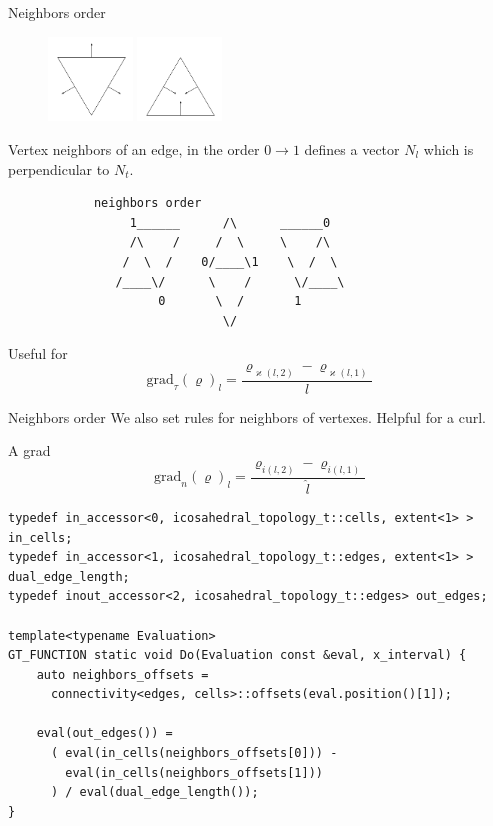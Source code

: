 \documentclass{beamer}
\begin{document}
\begin{frame}[fragile]{Neighbors order}
  \begin{figure}[htbp]
  \centering
  \includegraphics[width=0.2\textwidth]{flow_downward.pdf}
  \includegraphics[width=0.2\textwidth]{flow_upward.pdf}
  \end{figure}

  Vertex neighbors of an edge, in the order $0 \rightarrow 1$ defines a vector $N_l$ which is perpendicular to $N_t$.
  \begin{lstlisting}
            neighbors order
                 1______      /\      ______0
                 /\    /     /  \     \    /\
                /  \  /    0/____\1    \  /  \
               /____\/      \    /      \/____\
                     0       \  /       1
                              \/
  \end{lstlisting}

  Useful for
  \[\text{grad}_{\tau}(\varrho)_l = \frac{\varrho_{\varkappa(l,2)}-\varrho_{\varkappa(l,1)}}{l}\]
\end{frame}

\begin{frame}{Neighbors order}
  We also set rules for neighbors of vertexes. Helpful for a curl.
\end{frame}

\begin{frame}[fragile]{A grad}
  \[\text{grad}_n(\varrho)_l = \frac{\varrho_{i(l,2)}-\varrho_{i(l,1)}}{\hat{l}}\]

  \begin{lstlisting}[basicstyle=\scriptsize\ttfamily]
typedef in_accessor<0, icosahedral_topology_t::cells, extent<1> > in_cells;
typedef in_accessor<1, icosahedral_topology_t::edges, extent<1> > dual_edge_length;
typedef inout_accessor<2, icosahedral_topology_t::edges> out_edges;

template<typename Evaluation>
GT_FUNCTION static void Do(Evaluation const &eval, x_interval) {
    auto neighbors_offsets =
      connectivity<edges, cells>::offsets(eval.position()[1]);

    eval(out_edges()) =
      ( eval(in_cells(neighbors_offsets[0])) -
        eval(in_cells(neighbors_offsets[1]))
      ) / eval(dual_edge_length());
}
  \end{lstlisting}
\end{frame}
\end{document}
